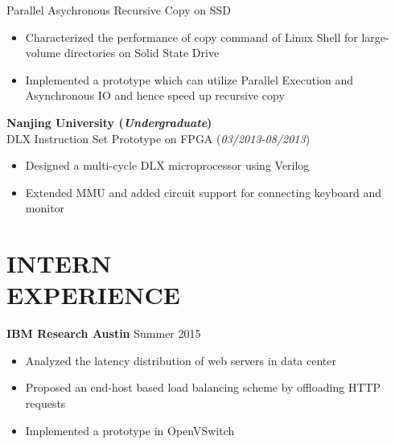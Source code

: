 \documentclass[margin, 9pt]{res} %
\begin{document}
\begin{resume}
\medskip
Parallel Asychronous Recursive Copy on SSD\\
\vspace*{-10pt}
\begin{itemize}[leftmargin=*] \itemsep -3pt
\vspace*{-5pt}
	\item Characterized the performance of copy command of Linux Shell for large-volume directories on Solid State Drive
	\item Implemented a prototype which can utilize Parallel Execution and Asynchronous IO and hence speed up recursive copy
\end{itemize}

\bigskip
{\large\textbf{Nanjing University (\textit{Undergraduate})}}\\

\vspace*{-7pt}
DLX Instruction Set Prototype on FPGA \hfill(\textit{03/2013-08/2013})\\
\vspace*{-10pt}
\begin{itemize}[leftmargin=*] \itemsep -3pt
\vspace*{-5pt}
	\item Designed a multi-cycle DLX microprocessor using Verilog
	\item Extended MMU and added circuit support for connecting keyboard and monitor
\end{itemize}


\section{INTERN\\ EXPERIENCE} 

{\textbf{IBM Research Austin}} \hfill{Summer 2015}\\
\vspace*{-10pt}
\begin{itemize}[leftmargin=*] \itemsep -3pt
\vspace*{-5pt}
	\item Analyzed the latency distribution of web servers in data center
	\item Proposed an end-host based load balancing scheme by offloading HTTP requests
	\item Implemented a prototype in OpenVSwitch
\end{itemize}


\end{resume}
\end{document}
